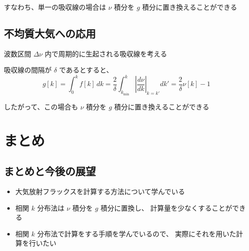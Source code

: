 \documentclass[article,nontitlepage,]{dennou777}
\begin{document}
すなわち、単一の吸収線の場合は $\nu$ 積分を $g$ 積分に置き換えることができる

\subsection{不均質大気への応用}
波数区間 $\Delta\nu$ 内で周期的に生起される吸収線を考える

吸収線の間隔が $\delta$ であるとすると、
\[
	g[k]=\int^k_0 f[k]\,dk
	=\frac{2}{\delta}\int^k_{k_{\mathrm{min}}}\left|\frac{d\nu}{dk}\right|_{k=k'}dk'
	=\frac{2}{\delta}\nu[k]-1
\]

したがって、この場合も $\nu$ 積分を $g$ 積分に置き換えることができる

\section{まとめ}

\subsection{まとめと今後の展望}
\begin{itemize}
	\item 大気放射フラックスを計算する方法について学んでいる
	\item 相関 $k$ 分布法は $\nu$ 積分を $g$ 積分に置換し、
		計算量を少なくすることができる
\end{itemize}

\begin{itemize}
	\item 相関 $k$ 分布法で計算をする手順を学んでいるので、
		実際にそれを用いた計算を行いたい
\end{itemize}
\end{document}
